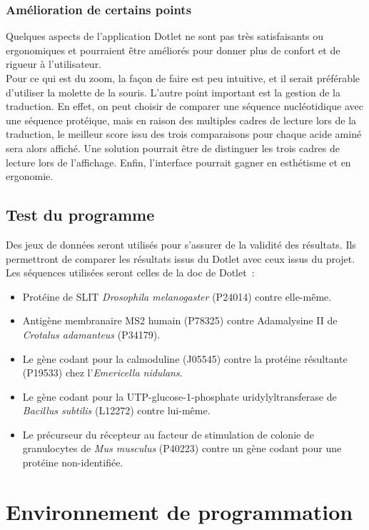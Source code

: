 \documentclass{report}
\begin{document}
\subsection{Amélioration de certains points}
Quelques aspects de l'application Dotlet ne sont pas très satisfaisants ou ergonomiques et pourraient être améliorés pour donner plus de confort et de rigueur à l'utilisateur.\\
Pour ce qui est du zoom, la façon de faire est peu intuitive, et il serait préférable d'utiliser la molette de la souris. L'autre point important est la gestion de la traduction. En effet, on peut choisir de comparer une séquence nucléotidique avec une séquence protéique, mais en raison des multiples cadres de lecture lors de la traduction, le meilleur score issu des trois comparaisons pour chaque acide aminé sera alors affiché. Une solution pourrait être de distinguer les trois cadres de lecture lors de l'affichage. Enfin, l'interface pourrait gagner en esthétisme et en ergonomie.

\section{Test du programme}

Des jeux de données seront utilisés pour s'assurer de la validité des résultats. Ils permettront de comparer les résultats issus du Dotlet avec ceux issus du projet.
Les séquences utilisées seront celles de la doc de Dotlet~:
\begin{itemize}
	\item Protéine de SLIT \emph{Drosophila melanogaster} (P24014) contre elle-même.
	\item Antigène membranaire MS2 humain (P78325) contre Adamalysine II de \emph{Crotalus adamanteus} (P34179).
	\item Le gène codant pour la calmoduline (J05545) contre la protéine résultante (P19533) chez l'\emph{Emericella nidulans}.
	\item Le gène codant pour la UTP-glucose-1-phosphate uridylyltransferase de \emph{Bacillus subtilis} (L12272) contre lui-même.
	\item Le précurseur du récepteur au facteur de stimulation de colonie de granulocytes de \emph{Mus musculus} (P40223) contre un gène codant pour une protéine non-identifiée.
\end{itemize}

\chapter{Environnement de programmation}
\end{document}
